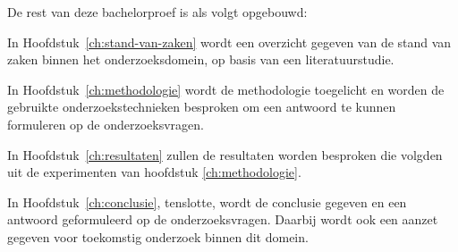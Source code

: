 
De rest van deze bachelorproef is als volgt opgebouwd:

In Hoofdstuk~\ref{ch:stand-van-zaken} wordt een overzicht gegeven van de stand van zaken binnen het onderzoeksdomein, op basis van een literatuurstudie.

In Hoofdstuk~\ref{ch:methodologie} wordt de methodologie toegelicht en worden de gebruikte onderzoekstechnieken besproken om een antwoord te kunnen formuleren op de onderzoeksvragen.

In Hoofdstuk~\ref{ch:resultaten} zullen de resultaten worden besproken die volgden uit de experimenten van hoofdstuk \ref{ch:methodologie}.


In Hoofdstuk~\ref{ch:conclusie}, tenslotte, wordt de conclusie gegeven en een antwoord geformuleerd op de onderzoeksvragen. Daarbij wordt ook een aanzet gegeven voor toekomstig onderzoek binnen dit domein.

